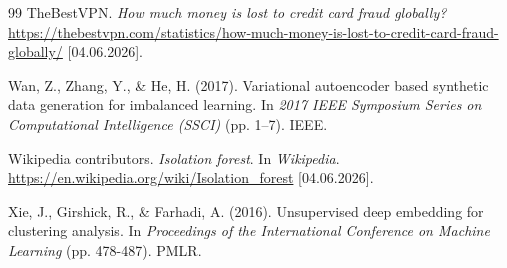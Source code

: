 \documentclass [runningheads]{llncs}
\begin{document}
\begin{thebibliography}{99}
TheBestVPN. 
\textit{How much money is lost to credit card fraud globally?}
\url{https://thebestvpn.com/statistics/how-much-money-is-lost-to-credit-card-fraud-globally/} [04.06.2026].

Wan, Z., Zhang, Y., \& He, H. (2017).
Variational autoencoder based synthetic data generation for imbalanced learning.
In \textit{2017 IEEE Symposium Series on Computational Intelligence (SSCI)}
(pp. 1--7). IEEE.

Wikipedia contributors. 
\textit{Isolation forest}.
In \textit{Wikipedia}.
\url{https://en.wikipedia.org/wiki/Isolation_forest} [04.06.2026].

Xie, J., Girshick, R., \& Farhadi, A. (2016).
Unsupervised deep embedding for clustering analysis.
In \textit{Proceedings of the International Conference on Machine Learning}
(pp. 478-487). PMLR.

\end{thebibliography}
\end{document}
